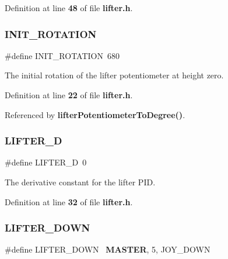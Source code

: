 Definition at line \textbf{ 48} of file \textbf{ lifter.\+h}.

\mbox{\label{lifter_8h_a0685a3cee7d5cabe98d2c9c97bed5727}} 
\subsubsection{I\+N\+I\+T\+\_\+\+R\+O\+T\+A\+T\+I\+ON}
{\footnotesize\ttfamily \#define I\+N\+I\+T\+\_\+\+R\+O\+T\+A\+T\+I\+ON~680}



The initial rotation of the lifter potentiometer at height zero. 



Definition at line \textbf{ 22} of file \textbf{ lifter.\+h}.



Referenced by \textbf{ lifter\+Potentiometer\+To\+Degree()}.

\mbox{\label{lifter_8h_ad03f59237a197767913457abd53f1780}} 
\subsubsection{L\+I\+F\+T\+E\+R\+\_\+D}
{\footnotesize\ttfamily \#define L\+I\+F\+T\+E\+R\+\_\+D~0}



The derivative constant for the lifter P\+ID. 



Definition at line \textbf{ 32} of file \textbf{ lifter.\+h}.

\mbox{\label{lifter_8h_a12f8c1de242a92f5694e6b80b990773a}} 
\subsubsection{L\+I\+F\+T\+E\+R\+\_\+\+D\+O\+WN}
{\footnotesize\ttfamily \#define L\+I\+F\+T\+E\+R\+\_\+\+D\+O\+WN~\textbf{ M\+A\+S\+T\+ER}, 5, J\+O\+Y\+\_\+\+D\+O\+WN}



